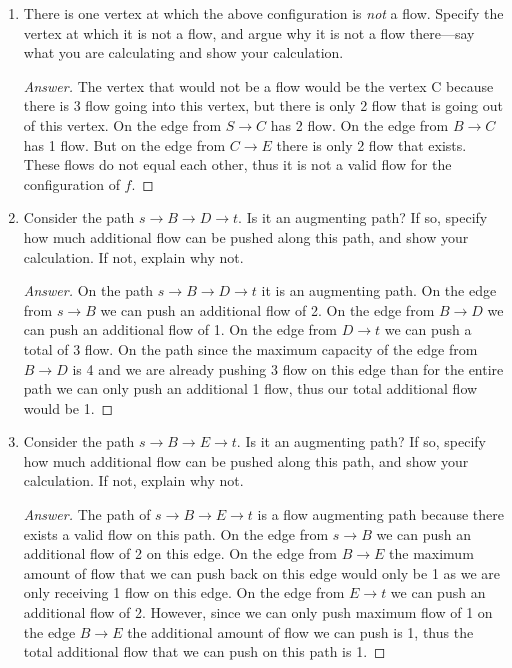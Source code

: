 \documentclass[11pt]{article}
\theoremstyle{definition}
\theoremstyle{definition}
\theoremstyle{definition}
\begin{document}
\renewcommand{\theenumi}{\alph{enumi}}
\begin{enumerate}
\item There is one vertex at which the above configuration is \emph{not} a flow. Specify the vertex at which it is not a flow, and argue why it is not a flow there---say what you are calculating and show your calculation.

\begin{proof}[Answer]
The vertex that would not be a flow would be the vertex C because there is 3 flow going into this vertex, but there is only 2 flow that is going out of this vertex. On the edge from $S \to C$ has 2 flow. On the edge from $B \to C$ has 1 flow. But on the edge from $C \to E$ there is only 2 flow that exists. These flows do not equal each other, thus it is not a valid flow for the configuration of $f$.
\end{proof}

\vfill
\item Consider the path $s \to B \to D \to t$. Is it an augmenting path? If so, specify how much additional flow can be pushed along this path, and show your calculation. If not, explain why not.

\begin{proof}[Answer]
On the path $s \to B \to D \to t$ it is an augmenting path. On the edge from $s \to B$ we can push an additional flow of 2. On the edge from $B \to D$ we can push an additional flow of 1. On the edge from $D \to t$ we can push a total of 3 flow. On the path since the maximum capacity of the edge from $B \to D$ is 4 and we are already pushing 3 flow on this edge than for the entire path we can only push an additional 1 flow, thus our total additional flow would be 1.
\end{proof}

\vfill
\newpage 

\item Consider the path $s \to B \to E \to t$. Is it an augmenting path? If so, specify how much additional flow can be pushed along this path, and show your calculation. If not, explain why not.

\begin{proof}[Answer]
The path of $s \to B \to E \to t$ is a flow augmenting path because there exists a valid flow on this path. On the edge from $s \to B$ we can push an additional flow of 2 on this edge. On the edge from $B \to E$ the maximum amount of flow that we can push back on this edge would only be 1 as we are only receiving 1 flow on this edge. On the edge from $E \to t$ we can push an additional flow of 2. However, since we can only push maximum flow of 1 on the edge $B \to E$ the additional amount of flow we can push is 1, thus the total additional flow that we can push on this path is 1.
\end{proof}


\end{enumerate}
\end{document}
